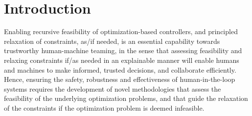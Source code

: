 \documentclass[letterpaper, 10 pt, conference]{ieeeconf}  %
\begin{document}
\section{Introduction}



Enabling recursive feasibility of optimization-based controllers, and principled relaxation of constraints, as/if needed, is an essential capability towards trustworthy human-machine teaming, in the sense that assessing feasibility and relaxing constraints if/as needed in an explainable manner will enable humans and machines to make informed, trusted decisions, and collaborate efficiently. Hence, ensuring the safety, robustness and effectiveness of human-in-the-loop systems requires the development of novel methodologies that assess the feasibility of the underlying optimization problems, and that guide the relaxation of the constraints if the optimization problem is deemed infeasible.
\end{document}
